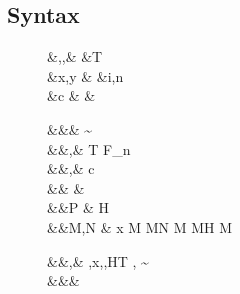 \documentclass[manuscript,screen,nonacm]{acmart}
\begin{document}
\subsection{Syntax}
\begin{figure}[ht]
  \centering
  \begin{syntax}
     &\alpha,\beta,\Co  &\qquad{} &T \\
     &x,y                  &\qquad{}        &i,n \in {} \\
     &c & &
  \end{syntax}
  \begin{syntax}
         &&\kappa       \bnfeq& \star \bnfor \kappa \to \kappa \bnfor \sigma \sim \tau\\
         &&\tau,\sigma  \bnfeq& \alpha \bnfor T \bnfor \tau \to \tau \bnfor \tau\App\tau \bnfor \Forall {\alpha\co\kappa} \tau \bnfor F_n\\
     &&\nu,\Co      \bnfeq& c \bnfor {}\tau \bnfor \Sym\Co \bnfor \trans\nu\Co %
                                        \bnfor \Forall {\alpha\co\kappa} \Co \bnfor \Co\At\tau %
                                        \bnfor \nu\App\Co \bnfor \Left \Co \bnfor \Right \Co\\  %
     && \phi \bnfeq& \tau \bnfor \Co\\
      &&P    \bnfeq& H\App \many{\alpha\co\kappa} \\
         &&M,N  \bnfeq& x \bnfor  {} M \bnfor M\App N \bnfor \TLam{\tau\co\kappa} M \bnfor M\App \tau \bnfor H \bnfor \Case M  \bnfor \Cast \Tm \Co\\

    \end{syntax}
    \begin{syntax}
     &&\TEnv,\Delta \bnfeq& \empt \bnfor \TEnv,x\co\tau \bnfor \TEnv,\alpha\co\kappa \bnfor \TEnv,H\co T \bnfor \TEnv, \Co \co \tau\sim\sigma\\
      &&\Subst       \bnfeq& \empt \bnfor \Set{\many{\alpha \mapsto \tau}}
  \end{syntax}


\end{figure}
\end{document}
